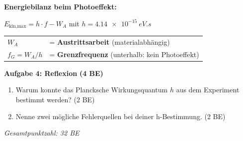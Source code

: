 \documentclass[11pt,a4paper]{article}
\begin{document}
\vspace{0.5em}


\begin{tcolorbox}[merkbox={Kasten 3: Die Photogleichung (Ergebnis)}]
\textbf{Energiebilanz beim Photoeffekt:}

\vspace{0.3em}
\hfill $\boxed{E_{\text{kin,max}} = h \cdot f - W_A}$ \hfill mit \hfill $h = \SI{4,14e-15}{eV.s}$ \hfill\mbox{}

\vspace{0.5em}
\begin{tabular}{ll}
$W_A$ & = \textbf{Austrittsarbeit} (materialabhängig) \\
$f_G = W_A / h$ & = \textbf{Grenzfrequenz} (unterhalb: kein Photoeffekt) \\
\end{tabular}
\end{tcolorbox}

\vspace{0.3em}


\textbf{Aufgabe 4: Reflexion} \hfill \textbf{(4 BE)}

\begin{enumerate}[label=\alph*)]
\item Warum konnte das Plancksche Wirkungsquantum $h$ aus dem Experiment bestimmt werden? \hfill (2 BE)

\vspace{1cm}

\item Nenne zwei mögliche Fehlerquellen bei deiner h-Bestimmung. \hfill (2 BE)

\vspace{1cm}

\end{enumerate}

\begin{center}
\small\textit{Gesamtpunktzahl: 32 BE}
\end{center}
\end{document}

